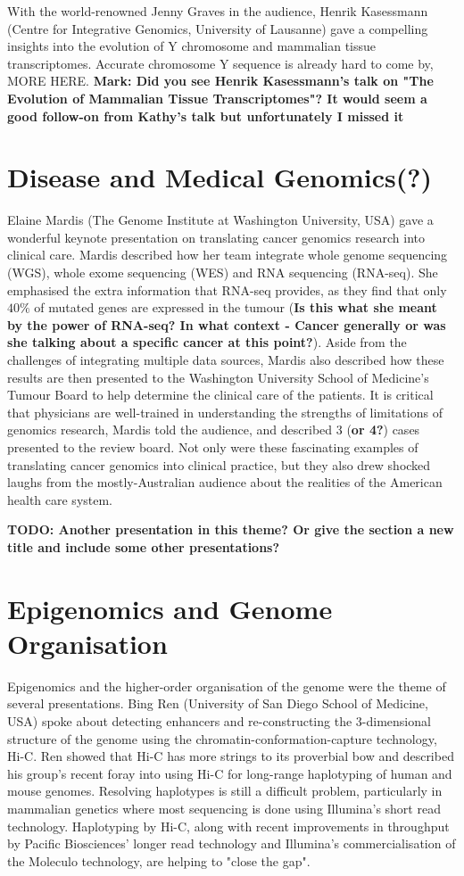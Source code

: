 \documentclass[twocolumn]{bmcart}%
\begin{document}
With the world-renowned Jenny Graves in the audience, Henrik Kasessmann (Centre for Integrative Genomics, University of Lausanne) gave a compelling insights into the evolution of Y chromosome and mammalian tissue transcriptomes.  Accurate chromosome Y sequence is already hard to come by, MORE HERE.
\textbf{Mark: Did you see Henrik Kasessmann's talk on "The Evolution of Mammalian Tissue Transcriptomes"? It would seem a good follow-on from Kathy's talk but unfortunately I missed it}

\section*{Disease and Medical Genomics(?)}
Elaine Mardis (The Genome Institute at Washington University, USA) gave a wonderful keynote presentation on translating cancer genomics research into clinical care. Mardis described how her team integrate whole genome sequencing (WGS), whole exome sequencing (WES) and RNA sequencing (RNA-seq). She emphasised the extra information that RNA-seq provides, as they find that only $40\%$ of mutated genes are expressed in the tumour (\textbf{Is this what she meant by the power of RNA-seq? In what context - Cancer generally or was she talking about a specific cancer at this point?}). Aside from the challenges of integrating multiple data sources, Mardis also described how these results are then presented to the Washington University School of Medicine's Tumour Board to help determine the clinical care of the patients. It is critical that physicians are well-trained in understanding the strengths of limitations of genomics research, Mardis told the audience, and described 3 (\textbf{or 4?}) cases presented to the review board. Not only were these fascinating examples of translating cancer genomics into clinical practice, but they also drew shocked laughs from the mostly-Australian audience about the realities of the American health care system. 

\textbf{TODO: Another presentation in this theme? Or give the section a new title and include some other presentations?}



\section*{Epigenomics and Genome Organisation}
Epigenomics and the higher-order organisation of the genome were the theme of several presentations. Bing Ren (University of San Diego School of Medicine, USA) spoke about detecting enhancers and re-constructing the 3-dimensional structure of the genome using the chromatin-conformation-capture technology, Hi-C. Ren showed that Hi-C has more strings to its proverbial bow and described his group's recent foray into using Hi-C for long-range haplotyping of human and mouse genomes. Resolving haplotypes is still a difficult problem, particularly in mammalian genetics where most sequencing is done using Illumina's short read technology. Haplotyping by Hi-C, along with recent improvements in throughput by Pacific Biosciences' longer read technology and Illumina's commercialisation of the Moleculo technology, are helping to "close the gap".
\end{document}
